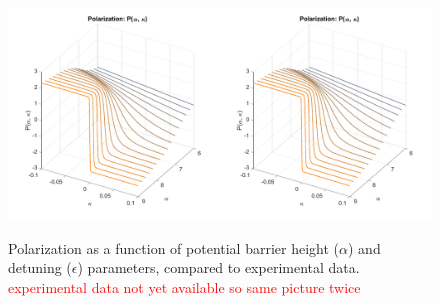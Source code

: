 \documentclass[aps,prb, 10pt]{revtex4-2}
\begin{document}
\begin{figure}[h]
\centering
\includegraphics[page=1,width=1\textwidth]{figure4plus6}
\label{3rdImage}
\caption{Polarization as a function of potential barrier height ($\alpha$) and detuning ($\epsilon$) parameters, compared to experimental data. {\textcolor{red}{experimental data not yet available so same picture twice}}}
\end{figure}
\end{document}

